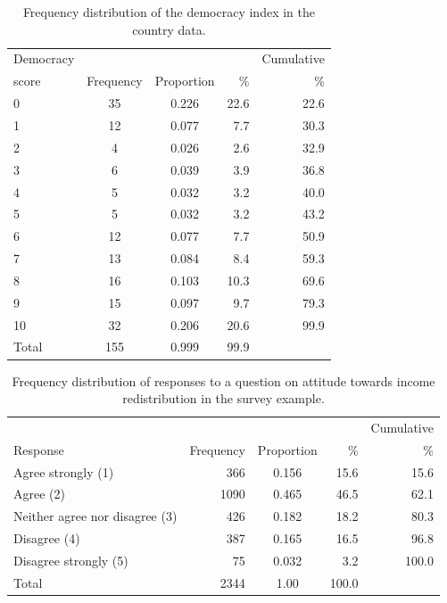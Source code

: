 \begin{table}[p]
\caption{Frequency distribution of the democracy index
in the country
data.}
\label{t_democ}
\begin{center}
\begin{tabular}{|lccrr|}\hline
Democracy & & & & Cumulative\\
score & Frequency & Proportion & \% & \% \\
\hline
0 & 35 & 0.226 & 22.6 & 22.6 \\
1 & 12 & 0.077 & 7.7 & 30.3 \\
2 & 4 & 0.026 & 2.6 & 32.9 \\
3 & 6 & 0.039 & 3.9 & 36.8 \\
4 & 5 & 0.032 & 3.2 & 40.0 \\
5 & 5 & 0.032 & 3.2 & 43.2 \\
6 & 12 & 0.077 & 7.7 & 50.9 \\
7 & 13 & 0.084 & 8.4 & 59.3 \\
8 & 16 & 0.103 & 10.3 & 69.6 \\
9 & 15 & 0.097 & 9.7 & 79.3 \\
10 & 32 & 0.206 & 20.6 & 99.9 \\
\hline
Total & 155 & 0.999 & 99.9 & \\
\hline
\end{tabular}
\end{center}
\end{table}

\begin{table}[p]
\caption{Frequency distribution of responses to a question on attitude towards income
redistribution in the survey example.}
\label{t_attitude}
\begin{center}
\begin{tabular}{|lrcrr|}\hline
 & & & & Cumulative\\
Response & Frequency & Proportion & \% & \% \\
\hline
Agree strongly (1) & 366 & 0.156 & 15.6 & 15.6 \\
Agree (2) & 1090 & 0.465 & 46.5 & 62.1 \\
Neither agree nor disagree (3) & 426 & 0.182 & 18.2 & 80.3 \\
Disagree (4) & 387 & 0.165 & 16.5 & 96.8 \\
Disagree strongly (5) & 75 & 0.032 & 3.2 & 100.0 \\
\hline
Total & 2344 & 1.00 & 100.0& \\
\hline
\end{tabular}
\end{center}
\end{table}

